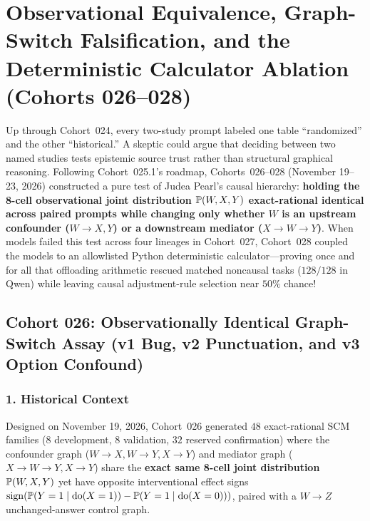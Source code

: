 \chapter{Observational Equivalence, Graph-Switch Falsification, and the Deterministic Calculator Ablation (Cohorts 026--028)}\label{ch:cohorts_026_028}

Up through Cohort~024, every two-study prompt labeled one table ``randomized'' and the other ``historical.'' A skeptic could argue that deciding between two named studies tests epistemic source trust rather than structural graphical reasoning. Following Cohort~025.1's roadmap, Cohorts~026--028 (November 19--23, 2026) constructed a pure test of Judea Pearl's causal hierarchy: \textbf{holding the 8-cell observational joint distribution $\mathbb{P}(W,X,Y)$ exact-rational identical across paired prompts while changing only whether $W$ is an upstream confounder ($W\to X,Y$) or a downstream mediator ($X\to W\to Y$)}. When models failed this test across four lineages in Cohort~027, Cohort~028 coupled the models to an allowlisted Python deterministic calculator---proving once and for all that offloading arithmetic rescued matched noncausal tasks ($128/128$ in Qwen) while leaving causal adjustment-rule selection near $50\%$ chance!

\section{Cohort 026: Observationally Identical Graph-Switch Assay (v1 Bug, v2 Punctuation, and v3 Option Confound)}

\subsection*{1. Historical Context}
Designed on November 19, 2026, Cohort~026 generated $48$ exact-rational SCM families ($8$ development, $8$ validation, $32$ reserved confirmation) where the confounder graph ($W\to X, W\to Y, X\to Y$) and mediator graph ($X\to W\to Y, X\to Y$) share the \textbf{exact same 8-cell joint distribution $\mathbb{P}(W,X,Y)$} yet have opposite interventional effect signs $\operatorname{sign}(\mathbb{P}(Y=1\mid \operatorname{do}(X=1)) - \mathbb{P}(Y=1\mid \operatorname{do}(X=0)))$, paired with a $W\to Z$ unchanged-answer control graph.

